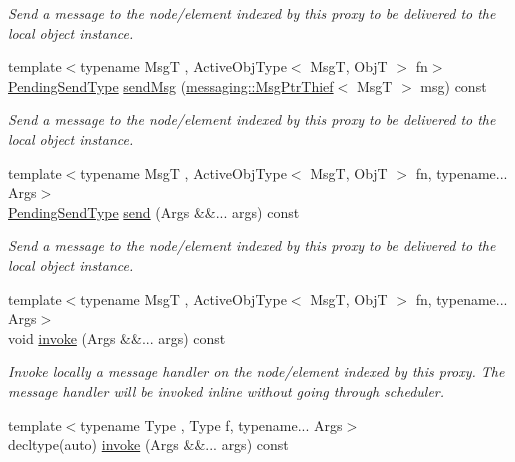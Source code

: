 \begin{DoxyCompactItemize}
\begin{DoxyCompactList}\small\item\em Send a message to the node/element indexed by this proxy to be delivered to the local object instance. \end{DoxyCompactList}\item 
{\footnotesize template$<$typename MsgT , Active\+Obj\+Type$<$ Msg\+T, Obj\+T $>$ fn$>$ }\\\hyperlink{structvt_1_1objgroup_1_1proxy_1_1_proxy_elm_ab0f40d6a0191c974a4f4dd9dec0fc02f}{Pending\+Send\+Type} \hyperlink{structvt_1_1objgroup_1_1proxy_1_1_proxy_elm_ad08b5f3df7ea73d8fd11b30225c8f971}{send\+Msg} (\hyperlink{structvt_1_1messaging_1_1_msg_ptr_thief}{messaging\+::\+Msg\+Ptr\+Thief}$<$ MsgT $>$ msg) const
\begin{DoxyCompactList}\small\item\em Send a message to the node/element indexed by this proxy to be delivered to the local object instance. \end{DoxyCompactList}\item 
{\footnotesize template$<$typename MsgT , Active\+Obj\+Type$<$ Msg\+T, Obj\+T $>$ fn, typename... Args$>$ }\\\hyperlink{structvt_1_1objgroup_1_1proxy_1_1_proxy_elm_ab0f40d6a0191c974a4f4dd9dec0fc02f}{Pending\+Send\+Type} \hyperlink{structvt_1_1objgroup_1_1proxy_1_1_proxy_elm_a00370ac0c4f3cf81b10685ea4963484d}{send} (Args \&\&... args) const
\begin{DoxyCompactList}\small\item\em Send a message to the node/element indexed by this proxy to be delivered to the local object instance. \end{DoxyCompactList}\item 
{\footnotesize template$<$typename MsgT , Active\+Obj\+Type$<$ Msg\+T, Obj\+T $>$ fn, typename... Args$>$ }\\void \hyperlink{structvt_1_1objgroup_1_1proxy_1_1_proxy_elm_a02cc360f62de45c52d97a69c464054cb}{invoke} (Args \&\&... args) const
\begin{DoxyCompactList}\small\item\em Invoke locally a message handler on the node/element indexed by this proxy. The message handler will be invoked inline without going through scheduler. \end{DoxyCompactList}\item 
{\footnotesize template$<$typename Type , Type f, typename... Args$>$ }\\decltype(auto) \hyperlink{structvt_1_1objgroup_1_1proxy_1_1_proxy_elm_a6dcda2aa12a605aceac3a1bba468e16f}{invoke} (Args \&\&... args) const

\end{DoxyCompactItemize}
